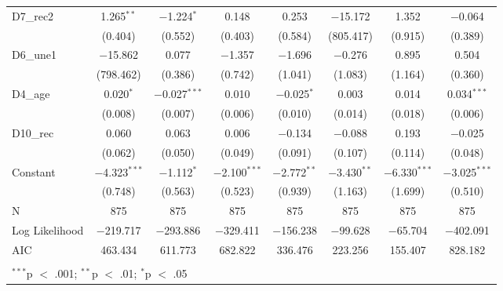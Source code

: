 \documentclass[
]{article}
\begin{document}
\begin{table}[!htbp]
\begin{tabular}{@{\extracolsep{5pt}}lccccccc}
  D7\_rec2 & 1.265$^{**}$ & $-$1.224$^{*}$ & 0.148 & 0.253 & $-$15.172 & 1.352 & $-$0.064 \\ 
  & (0.404) & (0.552) & (0.403) & (0.584) & (805.417) & (0.915) & (0.389) \\ 
  D6\_une1 & $-$15.862 & 0.077 & $-$1.357 & $-$1.696 & $-$0.276 & 0.895 & 0.504 \\ 
  & (798.462) & (0.386) & (0.742) & (1.041) & (1.083) & (1.164) & (0.360) \\ 
  D4\_age & 0.020$^{*}$ & $-$0.027$^{***}$ & 0.010 & $-$0.025$^{*}$ & 0.003 & 0.014 & 0.034$^{***}$ \\ 
  & (0.008) & (0.007) & (0.006) & (0.010) & (0.014) & (0.018) & (0.006) \\ 
  D10\_rec & 0.060 & 0.063 & 0.006 & $-$0.134 & $-$0.088 & 0.193 & $-$0.025 \\ 
  & (0.062) & (0.050) & (0.049) & (0.091) & (0.107) & (0.114) & (0.048) \\ 
  Constant & $-$4.323$^{***}$ & $-$1.112$^{*}$ & $-$2.100$^{***}$ & $-$2.772$^{**}$ & $-$3.430$^{**}$ & $-$6.330$^{***}$ & $-$3.025$^{***}$ \\ 
  & (0.748) & (0.563) & (0.523) & (0.939) & (1.163) & (1.699) & (0.510) \\ 
 N & 875 & 875 & 875 & 875 & 875 & 875 & 875 \\ 
Log Likelihood & $-$219.717 & $-$293.886 & $-$329.411 & $-$156.238 & $-$99.628 & $-$65.704 & $-$402.091 \\ 
AIC & 463.434 & 611.773 & 682.822 & 336.476 & 223.256 & 155.407 & 828.182 \\ 
\hline \\[-1.8ex] 
\multicolumn{8}{l}{$^{***}$p $<$ .001; $^{**}$p $<$ .01; $^{*}$p $<$ .05} \\ 
\end{tabular} 
\end{table}
\end{document}
